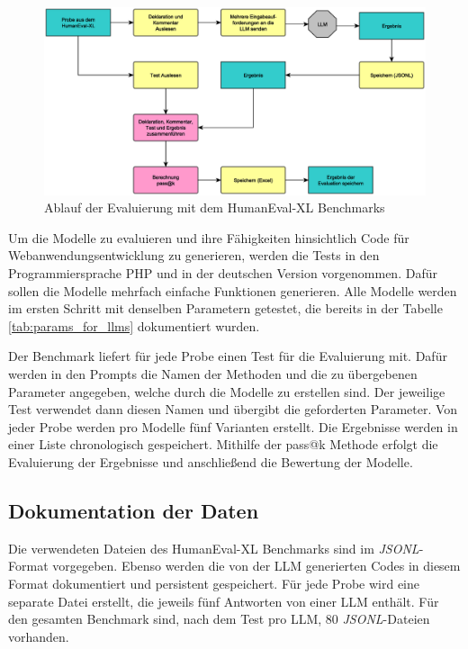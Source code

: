 \begin{figure}[!ht]
	\includegraphics[width=\textwidth]{content/chapter_concept_design/images/ablauf_evaluation.eps}
	\centering
	\caption{Ablauf der Evaluierung mit dem HumanEval-XL Benchmarks}
	\label{img:sequence_of_evaluation}
\end{figure}

Um die Modelle zu evaluieren und ihre Fähigkeiten hinsichtlich Code für Webanwendungsentwicklung zu generieren, werden die Tests in den Programmiersprache PHP und in der deutschen Version vorgenommen. Dafür sollen die Modelle mehrfach einfache Funktionen generieren. Alle Modelle werden im ersten Schritt mit denselben Parametern getestet, die bereits in der Tabelle \ref{tab:params_for_llms} dokumentiert wurden.\vspace{0.2cm}

Der Benchmark liefert für jede Probe einen Test für die Evaluierung mit. Dafür werden in den Prompts die Namen der Methoden und die zu übergebenen Parameter angegeben, welche durch die Modelle zu erstellen sind. Der jeweilige Test verwendet dann diesen Namen und übergibt die geforderten Parameter. Von jeder Probe werden pro Modelle fünf Varianten erstellt. Die Ergebnisse werden in einer Liste chronologisch gespeichert. Mithilfe der pass@k Methode erfolgt die Evaluierung der Ergebnisse und anschließend die Bewertung der Modelle.


\subsection{Dokumentation der Daten}
Die verwendeten Dateien des HumanEval-XL Benchmarks sind im \textit{JSONL}-Format vorgegeben. Ebenso werden die von der LLM generierten Codes in diesem Format dokumentiert und persistent gespeichert. Für jede Probe wird eine separate Datei erstellt, die jeweils fünf Antworten von einer LLM enthält. Für den gesamten Benchmark sind, nach dem Test pro LLM, 80 \textit{JSONL}-Dateien vorhanden.\vspace{0.2cm}

